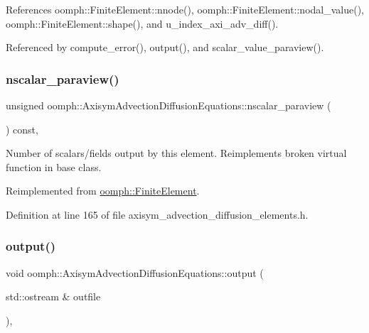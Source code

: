 References oomph\+::\+Finite\+Element\+::nnode(), oomph\+::\+Finite\+Element\+::nodal\+\_\+value(), oomph\+::\+Finite\+Element\+::shape(), and u\+\_\+index\+\_\+axi\+\_\+adv\+\_\+diff().



Referenced by compute\+\_\+error(), output(), and scalar\+\_\+value\+\_\+paraview().

\mbox{\label{classoomph_1_1AxisymAdvectionDiffusionEquations_a0015b0dfe81d34d01169a5e457751e06}} 
\subsubsection{\texorpdfstring{nscalar\+\_\+paraview()}{nscalar\_paraview()}}
{\footnotesize\ttfamily unsigned oomph\+::\+Axisym\+Advection\+Diffusion\+Equations\+::nscalar\+\_\+paraview (\begin{DoxyParamCaption}{ }\end{DoxyParamCaption}) const\hspace{0.3cm}{\ttfamily [inline]}, {\ttfamily [virtual]}}



Number of scalars/fields output by this element. Reimplements broken virtual function in base class. 



Reimplemented from \hyperlink{classoomph_1_1FiniteElement_a865e2e5586552ba80babdbe26a77fe8c}{oomph\+::\+Finite\+Element}.



Definition at line 165 of file axisym\+\_\+advection\+\_\+diffusion\+\_\+elements.\+h.

\mbox{\label{classoomph_1_1AxisymAdvectionDiffusionEquations_ae8cc538907edda147270ae26696919bd}} 
\subsubsection{\texorpdfstring{output()}{output()}\hspace{0.1cm}{\footnotesize\ttfamily [1/4]}}
{\footnotesize\ttfamily void oomph\+::\+Axisym\+Advection\+Diffusion\+Equations\+::output (\begin{DoxyParamCaption}\item[{std\+::ostream \&}]{outfile }\end{DoxyParamCaption})\hspace{0.3cm}{\ttfamily [inline]}, {\ttfamily [virtual]}}



